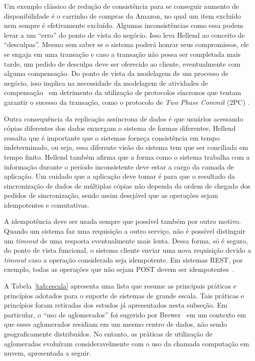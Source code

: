 Um exemplo clássico de redução de consistência para se conseguir aumento de disponibilidade é o carrinho de compras da Amazon, no qual um item excluído nem sempre é efetivamente excluído. Algumas inconsistências como essa podem levar a um ``erro'' do ponto de vista do negócio. Isso leva Hellend ao conceito de ``desculpas''. Mesmo sem saber se o sistema poderá honrar seus compromissos, ele se engaja em uma transação e caso a transação não possa ser completada mais tarde, um pedido de desculpa deve ser oferecido ao cliente, eventualmente com alguma compensação. Do ponto de vista da modelagem de um processo de negócio, isso implica na necessidade da modelagem de atividades de compensação~\cite{Garcia1991Saga} em detrimento da utilização de protocolos síncronos que tentam garantir o sucesso da transação, como o protocolo de \textit{Two Phase Commit} (2PC) \cite{Bernstein20092PC}.

Outra consequência da replicação assíncrona de dados é que usuários acessando cópias diferentes dos dados enxergam o sistema de formas diferentes. Hellend ressalta que é importante que o sistemas forneça consistência em tempo indeterminado, ou seja, essa diferente visão do sistema tem que ser conciliada em tempo finito. Hellend também afirma que a forma como o sistema trabalha com a informação durante o período inconsistente deve estar a cargo da camada de aplicação. Um cuidado que a aplicação deve tomar é para que o resultado da sincronização de dados de múltiplas cópias não dependa da ordem de chegada dos pedidos de sincronização, sendo assim desejável que as operações sejam idempotentes e comutativas. 

A idempotência deve ser usada sempre que possível também por outro motivo. Quando um sistema faz uma requisição a outro serviço, não é possível distinguir um \emph{timeout} de uma resposta eventualmente mais lenta. Dessa forma, só é seguro, do ponto de vista funcional, o sistema cliente enviar uma nova requisição devido a \emph{timeout} caso a operação considerada seja idempotente. Em sistemas REST, por exemplo, todas as operações que não sejam POST devem ser idempotentes~\cite{Allamaraju2010REST}.

A Tabela~\ref{tab:escala} apresenta uma lista que resume as principais práticas e princípios adotados para o suporte de sistemas de grande escala. Tais práticas e princípios foram retiradas dos estudos já apresentados nesta subseção. Em particular, o ``uso de aglomerados'' foi sugerido por Brewer~\cite{Brewer2001GiantScale} em um contexto em que esses aglomerados residiam em um mesmo centro de dados, não sendo geograficamente distribuídos. No entanto, as práticas de utilização de aglomeradas evoluíram consideravelmente com o uso da chamada computação em nuvem, apresentada a seguir.

